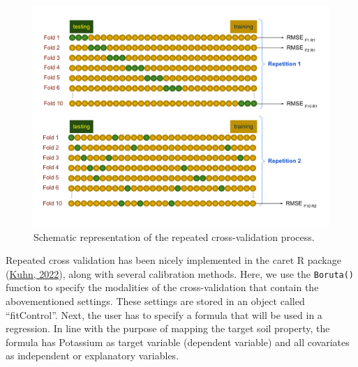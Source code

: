 \documentclass[
  10pt,
  b5paper,
  oneside]{book}
\begin{document}
\begin{figure}
\includegraphics[width=27.78in]{images/cv} \caption{Schematic representation of the repeated cross-validation process.}\label{fig:cv}
\end{figure}

Repeated cross validation has been nicely implemented in the caret R package (\protect\hyperlink{ref-Kuhn2022}{Kuhn, 2022}), along with several calibration methods. Here, we use the \texttt{Boruta()} function to specify the modalities of the cross-validation that contain the abovementioned settings. These settings are stored in an object called ``fitControl''. Next, the user has to specify a formula that will be used in a regression. In line with the purpose of mapping the target soil property, the formula has Potassium as target variable (dependent variable) and all covariates as independent or explanatory variables.
\end{document}
